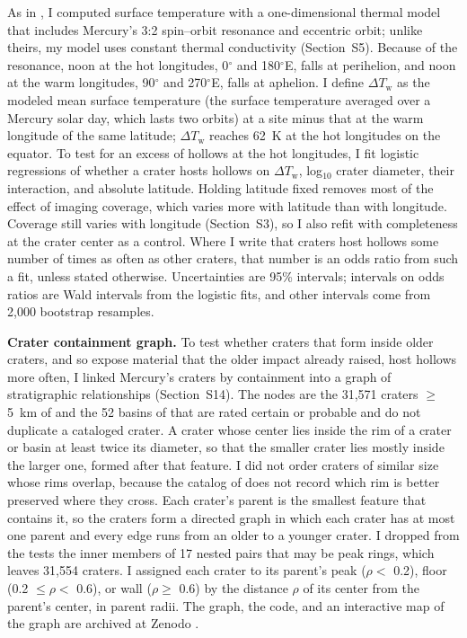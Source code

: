 \documentclass[article,review]{planetary}
\begin{document}
As in \textcite{vasavada1999}, I computed surface temperature with a one-dimensional thermal model that includes Mercury's 3:2 spin--orbit resonance and eccentric orbit; unlike theirs, my model uses constant thermal conductivity (Section~S5). Because of the resonance, noon at the hot longitudes, 0$^\circ$ and 180$^\circ$E, falls at perihelion, and noon at the warm longitudes, 90$^\circ$ and 270$^\circ$E, falls at aphelion. I define $\Delta T_\mathrm{w}$ as the modeled mean surface temperature (the surface temperature averaged over a Mercury solar day, which lasts two orbits) at a site minus that at the warm longitude of the same latitude; $\Delta T_\mathrm{w}$ reaches 62~K at the hot longitudes on the equator. To test for an excess of hollows at the hot longitudes, I fit logistic regressions of whether a crater hosts hollows on $\Delta T_\mathrm{w}$, log$_{10}$ crater diameter, their interaction, and absolute latitude. Holding latitude fixed removes most of the effect of imaging coverage, which varies more with latitude than with longitude. Coverage still varies with longitude (Section~S3), so I also refit with completeness at the crater center as a control. Where I write that craters host hollows some number of times as often as other craters, that number is an odds ratio from such a fit, unless stated otherwise. Uncertainties are 95\% intervals; intervals on odds ratios are Wald intervals from the logistic fits, and other intervals come from 2,000 bootstrap resamples.

\textbf{Crater containment graph.} To test whether craters that form inside older craters, and so expose material that the older impact already raised, host hollows more often, I linked Mercury's craters by containment into a graph of stratigraphic relationships (Section~S14). The nodes are the 31,571 craters $\geq$ 5~km of \textcite{herrick2018} and the 52 basins of \textcite{orgel2020} that are rated certain or probable and do not duplicate a cataloged crater. A crater whose center lies inside the rim of a crater or basin at least twice its diameter, so that the smaller crater lies mostly inside the larger one, formed after that feature. I did not order craters of similar size whose rims overlap, because the catalog of \textcite{herrick2018} does not record which rim is better preserved where they cross. Each crater's parent is the smallest feature that contains it, so the craters form a directed graph in which each crater has at most one parent and every edge runs from an older to a younger crater. I dropped from the tests the inner members of 17 nested pairs that may be peak rings, which leaves 31,554 craters. I assigned each crater to its parent's peak ($\rho <$ 0.2), floor (0.2 $\leq \rho <$ 0.6), or wall ($\rho \geq$ 0.6) by the distance $\rho$ of its center from the parent's center, in parent radii. The graph, the code, and an interactive map of the graph are archived at Zenodo \parencite{zenodo_cratergraph}.
\end{document}
